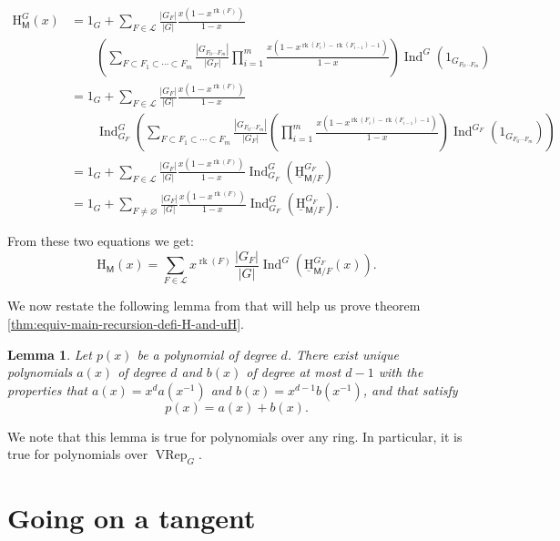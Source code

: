 \documentclass[11pt, a4paper, english]{amsart}
\theoremstyle{teoremas}
\newtheorem{lemma}[theorem]{Lemma}
\theoremstyle{definition}
\DeclareMathOperator{\rk}{rk}
\newcommand{\M}{\mathsf{M}}
\renewcommand{\H}{\mathrm{H}}
\newcommand{\uH}{\underline{\mathrm{H}}}
\newcommand{\cL}{\mathcal{L}}
\newcommand{\VRep}{\operatorname{VRep}}
\newcommand{\Ind}{\operatorname{Ind}}
\begin{document}
\begin{align*}
    \H_{\M}^G(x) &= 1_G + \sum_{F\in\cL}\frac{|G_{F}|}{|G|}
        \frac{x(1-x^{\rk(F)})}{1-x}\\
        &\qquad\left(\sum_{F\subset F_1\subset \cdots \subset F_m}\frac{|G_{F_0\cdots F_m}|}{|G_F|}
        \prod_{i=1}^{m}{\frac{x(1-x^{\rk(F_i)-\rk(F_{i-1})-1})}{1-x}}\right)
        \Ind^G\left(1_{G_{F_0\cdots F_m}}\right)\\
        &= 1_G + \sum_{F\in\cL}\frac{|G_{F}|}{|G|}\frac{x(1-x^{\rk(F)})}{1-x}\\
        &\qquad
        \Ind^G_{G_F}\left(\sum_{F\subset F_1\subset \cdots \subset F_m}\frac{|G_{F_0\cdots F_m}|}{|G_F|}
        \left(\prod_{i=1}^{m}{\frac{x(1-x^{\rk(F_i)-\rk(F_{i-1})-1})}{1-x}}\right)
        \Ind^{G_F}\left(1_{G_{F_0\cdots F_m}}\right)\right)\\
        &= 1_G + \sum_{F\in\cL}\frac{|G_{F}|}{|G|}\frac{x(1-x^{\rk(F)})}{1-x}
        \Ind^G_{G_F}\left(\uH_{\M/F}^{G_F}\right)\\
        &= 1_G + \sum_{F\neq\varnothing}\frac{|G_{F}|}{|G|}\frac{x(1-x^{\rk(F)})}{1-x}
        \Ind^G_{G_F}\left(\uH_{\M/F}^{G_F}\right).
\end{align*}

From these two equations we get:
\[\H_\M(x) = \sum_{F\in\cL}x^{\rk(F)}\,\frac{|G_{F}|}{|G|}\Ind^G\left(\uH_{\M/F}^{G_F}(x)
\right).\]

We now restate the following lemma from \cite{fmsv24} that will help us prove
theorem \ref{thm:equiv-main-recursion-defi-H-and-uH}.

\begin{lemma}\label{lem:stapledon}
    Let $p(x)$ be a polynomial of degree $d$. There exist unique polynomials $a(x)$ of degree
$d$ and $b(x)$ of degree at most $d-1$ with the properties that $a(x)=x^da(x^{-1})$ and
$b(x) = x^{d-1}b(x^{-1})$, and that satisfy
\[p(x)=a(x)+b(x).\]
\end{lemma}
We note that this lemma is true for polynomials over any ring. In particular,
it is true for polynomials over $\VRep_G$.
\section{Going on a tangent}



\end{document}
